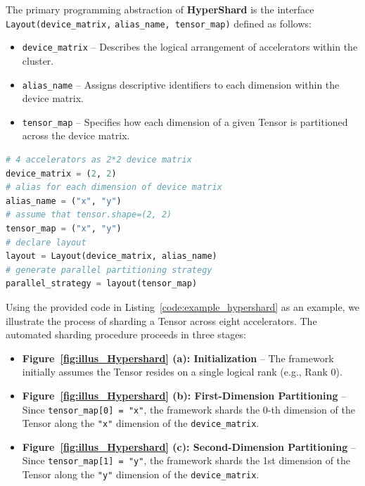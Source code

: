 \documentclass[11pt]{article}
\begin{document}
The primary programming abstraction of \textbf{HyperShard} is the interface \verb|Layout(device_matrix,|   \verb|alias_name, tensor_map)| defined as follows:
\begin{itemize}
    \item \verb|device_matrix| -- Describes the logical arrangement of accelerators within the cluster.
    \item \verb|alias_name| -- Assigns descriptive identifiers to each dimension within the device matrix.
    \item \verb|tensor_map| -- Specifies how each dimension of a given Tensor is partitioned across the device matrix.
\end{itemize}




\begin{center}
\begin{minipage}{0.6\textwidth} %
\begin{lstlisting}[language=Python,label={code:example_hypershard},caption=Hypershard strategy generation example.]
# 4 accelerators as 2*2 device matrix 
device_matrix = (2, 2) 
# alias for each dimension of device matrix
alias_name = ("x", "y")
# assume that tensor.shape=(2, 2)
tensor_map = ("x", "y")
# declare layout
layout = Layout(device_matrix, alias_name)
# generate parallel partitioning strategy
parallel_strategy = layout(tensor_map)
\end{lstlisting}
\end{minipage}
\end{center}


Using the provided code in Listing~\ref{code:example_hypershard} as an example, we illustrate the process of sharding a Tensor across eight accelerators. The automated sharding procedure proceeds in three stages:
\begin{itemize}
    \item \textbf{Figure~\ref{fig:illus_Hypershard} (a): Initialization} -- The framework initially assumes the Tensor resides on a single logical rank (e.g., Rank 0).
    \item \textbf{Figure~\ref{fig:illus_Hypershard} (b): First-Dimension Partitioning} -- Since \verb|tensor_map[0] = "x"|, the framework shards the 0-th dimension of the Tensor along the \verb|"x"| dimension of the \verb|device_matrix|.
    \item \textbf{Figure~\ref{fig:illus_Hypershard} (c): Second-Dimension Partitioning} -- Since \verb|tensor_map[1] = "y"|, the framework shards the 1st dimension of the Tensor along the \verb|"y"| dimension of the \verb|device_matrix|.
\end{itemize}
\end{document}

